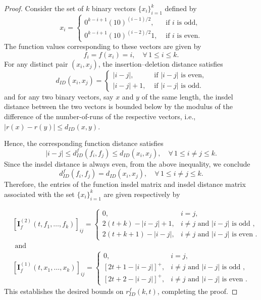 \documentclass[11 pt]{article}
\numberwithin{equation}{section}
\begin{document}
    \begin{proof}
        Consider the set of \( k  \) binary vectors \( \{x_i\}_{i=1}^{k} \) defined by
        \[
            x_i = 
            \begin{cases}
                0^{k-i+1}(10)^{(i-1)/2}, &  \text{ if $i$ is odd},\\[4pt]
                0^{k-i+1}(10)^{(i-2)/2}1, & \text{ if $i$ is even.}
            \end{cases}
        \]
        The function values corresponding to these vectors are given by
        \[
            f_i = f(x_i) = i , \quad \forall\, 1 \leq i \leq k.
        \]
        For any distinct pair \( (x_i, x_j) \), the insertion–deletion distance satisfies
        \[
            d_{ID}(x_i, x_j) =
            \begin{cases}
                |i-j|, & \text{ if $|i-j|$ is even,}\\
                |i - j| + 1, & \text{ if $|i-j|$ is odd.}
            \end{cases}
        \]
        and for any two binary vectors, say $x$ and $y$ of the same length, the insdel distance between the two vectors is bounded below by the modulus of the difference of the number-of-runs of the respective vectors, i.e., $|r(x) -r(y)| \leq d_{ID}(x,y)$. 

        \noindent
        Hence, the corresponding function distance satisfies
        \[
            |i-j| \leq d_{ID}^{f}(f_i, f_j) \leq d_{ID}(x_i, x_j), 
            \quad \forall\, 1 \leq i \neq j \leq k .
        \]
        Since the insdel distance is always even, from the above inequality, we conclude $$d_{ID}^{f}(f_i, f_j) = d_{ID}(x_i, x_j), \quad \forall\, 1 \leq i \neq j \leq k.$$
        Therefore, the entries of the function insdel matrix and insdel distance matrix associated with the set \( \{x_i\}_{i=1}^{k} \) are given respectively by
            
             \begin{align*}
            &[\bm{I}_f^{(2)}(t, f_1, \ldots, f_{k})]_{ij} =
            \begin{cases}
                0,      & i = j, \\[4pt]
                2(t + k) - |i-j| + 1, & i \neq j \text{ and } |i-j| \text{ is odd }, \\
                2(t + k + 1) - |i-j|, & i \neq j \text{ and } |i-j| \text{ is even }.
            \end{cases}\\
            &\text{ and }\\
            &[\bm{I}_{f}^{(1)}(t, x_1, \ldots, x_{k})]_{ij} =
            \begin{cases}
                0,  & i = j, \\[4pt]
                [2t + 1 - |i - j|]^+ , & i \neq j \text{ and } |i-j| \text{ is odd },\\
                [2t + 2 - |i-j|]^+,    & i \neq j \text{ and } |i-j| \text{ is even }. 
            \end{cases}
            \end{align*}      
        This establishes the desired bounds on $r^{f}_{{ID}}(k, t)$, completing the proof.
    \end{proof}
\end{document}
